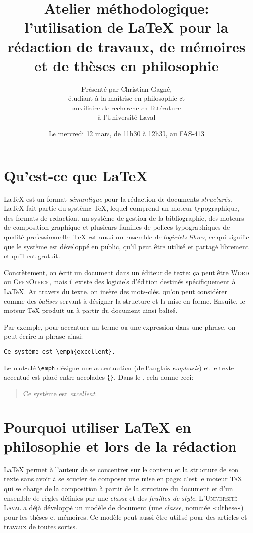 \documentclass{article}
\title{Atelier méthodologique: l’utilisation de \LaTeX{} pour la rédaction de travaux, de mémoires et de thèses en philosophie}
\author{Présenté par Christian Gagné, \\
étudiant à la maîtrise en philosophie et \\
auxiliaire de recherche en littérature \\
à l’Université Laval}
\date{Le mercredi 12 mars, de 11h30 à 12h30, au FAS-413}
\begin{document}
\maketitle

\thispagestyle{empty}
\pagestyle{empty}

\section{Qu’est-ce que \LaTeX{}}

\LaTeX{} est un format \emph{sémantique} pour la rédaction de documents \emph{structurés}. \LaTeX{} fait partie du système \TeX{}, lequel comprend un moteur typographique, des formats de rédaction, un système de gestion de la bibliographie, des moteurs de composition graphique et plusieurs familles de polices typographiques de qualité professionnelle. \TeX{} est aussi un ensemble de \emph{logiciels libres}, ce qui signifie que le système est développé en public, qu’il peut être utilisé et partagé librement et qu’il est gratuit.

Concrètement, on écrit un document dans un éditeur de texte: ça peut être \textsc{Word} ou \textsc{OpenOffice}, mais il existe des logiciels d’édition destinés spécifiquement à \LaTeX{}. Au travers du texte, on insère des mots-clés, qu’on peut considérer comme des \emph{balises} servant à désigner la structure et la mise en forme. Ensuite, le moteur \TeX{} produit un  à partir du document ainsi balisé.

Par exemple, pour accentuer un terme ou une expression dans une phrase, on peut écrire la phrase ainsi:

\begin{verbatim}
Ce système est \emph{excellent}.
\end{verbatim}

Le mot-clé \verb$\emph$ désigne une accentuation (de l’anglais \emph{emphasis}) et le texte accentué est placé entre accolades \verb${}$. Dans le , cela donne ceci:

\begin{quote}
Ce système est \emph{excellent}.
\end{quote}

\section{Pourquoi utiliser \LaTeX{} en philosophie et lors de la rédaction}

\LaTeX{} permet à l’auteur de se concentrer sur le contenu et la structure de son texte sans avoir à se soucier de composer une mise en page: c’est le moteur \TeX{} qui se charge de la composition à partir de la structure du document et d’un ensemble de règles définies par une \emph{classe} et des \emph{feuilles de style}. L’\textsc{Université Laval} a déjà développé un modèle de document (une \emph{classe}, nommée «\href{http://ctan.org/pkg/ulthese}{ulthese}») pour les thèses et mémoires. Ce modèle peut aussi être utilisé pour des articles et travaux de toutes sortes.
\end{document}
